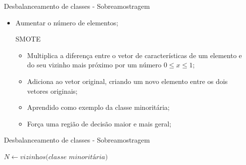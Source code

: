 \documentclass{beamer}
\begin{document}
\begin{frame}{Desbalanceamento de classes - Sobreamostragem}
\setlength\leftmargini{0em}
\justifying
    \begin{itemize}
        \item Aumentar o número de elementos;
    \begin{block}{SMOTE}
\setlength\leftmargini{1em}
        \begin{itemize}
            \item Multiplica a diferença entre o vetor de características de um elemento e do seu vizinho mais próximo por um número $0 \leq x \leq 1$;
            \item Adiciona ao vetor original, criando um novo elemento entre os dois vetores originais;
            \item Aprendido como exemplo da classe minoritária;
            \item Força uma região de decisão maior e mais geral;
        \end{itemize}
    \end{block}
    \end{itemize}
\end{frame}
\begin{frame}{Desbalanceamento de classes - Sobreamostragem}
\setlength\leftmargini{0em}
\justifying
  \begin{algorithm}[H]
    \caption{SMOTE: método para rebalancear classes}
    \SetAlgoLined
    $N \gets \textit{vizinhos(classe minoritária)}$\;
  \end{algorithm}
\end{frame}
\end{document}
